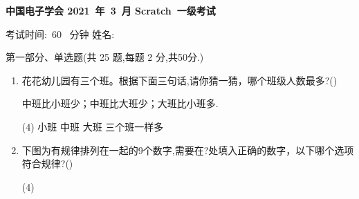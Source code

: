 \documentclass[10pt, a4paper]{article}
\newcommand{\Title}[3]{
    \begin{center}
        \Large \textbf{中国电子学会 #1~年~#2~月 Scratch~#3级考试}
    \end{center}
}
\newcommand{\TimeAndName}[1]{
    \begin{center}
        考试时间:~#1~ 分钟 \qquad\qquad\qquad\qquad 姓名:\underline{\quad\quad\quad\quad}
    \end{center}
}
\begin{document}
    \Title{2021}{3}{一}
    
    \TimeAndName{60}
    
    {\noindent\heiti 第一部分、单选题(共 25 题,每题 2 分,共50分.)}

    \begin{enumerate}
        \item  花花幼儿园有三个班。根据下面三句话,请你猜一猜，哪个班级人数最多?(\qquad)
        
        中班比小班少；中班比大班少；大班比小班多.
        \begin{tasks}(4)
            \task 小班
            \task 中班
            \task 大班
            \task 三个班一样多
        \end{tasks}

        \item 下图为有规律排列在一起的9个数字,需要在?处填入正确的数字，以下哪个选项符合规律?(\qquad)
        \begin{tasks}(4)
        \end{tasks}


\end{enumerate}
\end{document}
